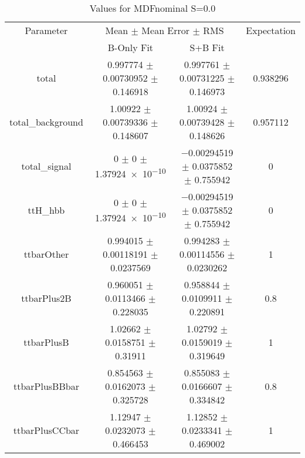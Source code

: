 \begin{table}
\centering
\caption{Values for MDFnominal S=0.0}
\begin{tabular}{cccc}
\toprule
Parameter & \multicolumn{2}{c}{Mean $\pm$ Mean Error $\pm$ RMS} & Expectation\\
 & B-Only Fit & S+B Fit & \\
\midrule
total & \num{0.997774} $\pm$ \num{0.00730952} $\pm$ \num{0.146918} & \num{0.997761} $\pm$ \num{0.00731225} $\pm$ \num{0.146973} & \num{0.938296}\\
total\_background & \num{1.00922} $\pm$ \num{0.00739336} $\pm$ \num{0.148607} & \num{1.00924} $\pm$ \num{0.00739428} $\pm$ \num{0.148626} & \num{0.957112}\\
total\_signal & \num{0} $\pm$ \num{0} $\pm$ \num{1.37924e-10} & \num{-0.00294519} $\pm$ \num{0.0375852} $\pm$ \num{0.755942} & \num{0}\\
ttH\_hbb & \num{0} $\pm$ \num{0} $\pm$ \num{1.37924e-10} & \num{-0.00294519} $\pm$ \num{0.0375852} $\pm$ \num{0.755942} & \num{0}\\
ttbarOther & \num{0.994015} $\pm$ \num{0.00118191} $\pm$ \num{0.0237569} & \num{0.994283} $\pm$ \num{0.00114556} $\pm$ \num{0.0230262} & \num{1}\\
ttbarPlus2B & \num{0.960051} $\pm$ \num{0.0113466} $\pm$ \num{0.228035} & \num{0.958844} $\pm$ \num{0.0109911} $\pm$ \num{0.220891} & \num{0.8}\\
ttbarPlusB & \num{1.02662} $\pm$ \num{0.0158751} $\pm$ \num{0.31911} & \num{1.02792} $\pm$ \num{0.0159019} $\pm$ \num{0.319649} & \num{1}\\
ttbarPlusBBbar & \num{0.854563} $\pm$ \num{0.0162073} $\pm$ \num{0.325728} & \num{0.855083} $\pm$ \num{0.0166607} $\pm$ \num{0.334842} & \num{0.8}\\
ttbarPlusCCbar & \num{1.12947} $\pm$ \num{0.0232073} $\pm$ \num{0.466453} & \num{1.12852} $\pm$ \num{0.0233341} $\pm$ \num{0.469002} & \num{1}\\
\bottomrule
\end{tabular}
\end{table}